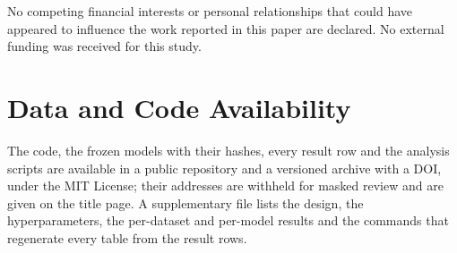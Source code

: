 \documentclass[11pt,a4paper]{article}
\begin{document}
No competing financial interests or personal relationships that could have
appeared to influence the work reported in this paper are declared. No
external funding was received for this study.

\section*{Data and Code Availability}
\label{sec:artifacts}

The code, the frozen models with their hashes, every result row and the
analysis scripts are available in a public repository and a versioned
archive with a DOI, under the MIT License; their addresses are withheld for
masked review and are given on the title page. A supplementary file lists
the design, the hyperparameters, the per-dataset and per-model results and
the commands that regenerate every table from the result rows.
\end{document}
